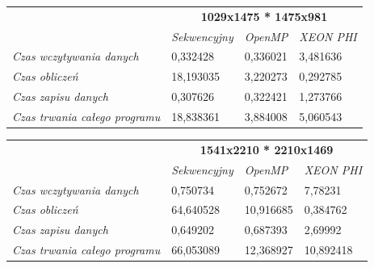 \documentclass[a4paper]{article}
\begin{document}
\begin{table}
\begin{tabular}{l|l|l|l|}
\cline{2-4}
                                                            & \multicolumn{3}{|c|}{\textbf{1029x1475 * 1475x981}}        \\ \cline{2-4} 
                                                            & \textit{Sekwencyjny} & \textit{OpenMP} & \textit{XEON PHI} \\ \hline
\multicolumn{1}{|l|}{\textit{Czas wczytywania danych}}      & 0,332428             & 0,336021        & 3,481636          \\ \hline
\multicolumn{1}{|l|}{\textit{Czas obliczeń}}                & 18,193035            & 3,220273        & 0,292785          \\ \hline
\multicolumn{1}{|l|}{\textit{Czas zapisu danych}}           & 0,307626             & 0,322421        & 1,273766          \\ \hline
\multicolumn{1}{|l|}{\textit{Czas trwania całego programu}} & 18,838361            & 3,884008        & 5,060543          \\ \hline
\end{tabular}
\end{table}

\begin{table}
\begin{tabular}{l|l|l|l|}
\cline{2-4}
                                                            & \multicolumn{3}{|c|}{\textbf{1541x2210 * 2210x1469}}       \\ \cline{2-4} 
                                                            & \textit{Sekwencyjny} & \textit{OpenMP} & \textit{XEON PHI} \\ \hline
\multicolumn{1}{|l|}{\textit{Czas wczytywania danych}}      & 0,750734             & 0,752672        & 7,78231           \\ \hline
\multicolumn{1}{|l|}{\textit{Czas obliczeń}}                & 64,640528            & 10,916685       & 0,384762          \\ \hline
\multicolumn{1}{|l|}{\textit{Czas zapisu danych}}           & 0,649202             & 0,687393        & 2,69992           \\ \hline
\multicolumn{1}{|l|}{\textit{Czas trwania całego programu}} & 66,053089            & 12,368927       & 10,892418         \\ \hline
\end{tabular}
\end{table}
\end{document}
